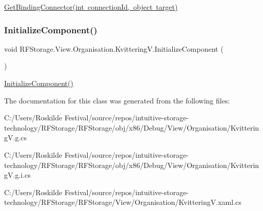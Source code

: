 \mbox{\hyperlink{class_r_f_storage_1_1_view_1_1_organisation_1_1_kvittering_v_a2eb92c4d9d4ef6ab0aed08083044615f}{Get\+Binding\+Connector(int connection\+Id, object target)}} 

\mbox{\label{class_r_f_storage_1_1_view_1_1_organisation_1_1_kvittering_v_af4cdfc1cc8430c3282e5c1dce8560fea}} 
\subsubsection{\texorpdfstring{InitializeComponent()}{InitializeComponent()}}
{\footnotesize\ttfamily void R\+F\+Storage.\+View.\+Organisation.\+Kvittering\+V.\+Initialize\+Component (\begin{DoxyParamCaption}{ }\end{DoxyParamCaption})}



\mbox{\hyperlink{class_r_f_storage_1_1_view_1_1_organisation_1_1_kvittering_v_af4cdfc1cc8430c3282e5c1dce8560fea}{Initialize\+Component()}} 



The documentation for this class was generated from the following files\+:\begin{DoxyCompactItemize}
\item 
C\+:/\+Users/\+Roskilde Festival/source/repos/intuitive-\/storage-\/technology/\+R\+F\+Storage/\+R\+F\+Storage/obj/x86/\+Debug/\+View/\+Organisation/Kvittering\+V.\+g.\+cs\item 
C\+:/\+Users/\+Roskilde Festival/source/repos/intuitive-\/storage-\/technology/\+R\+F\+Storage/\+R\+F\+Storage/obj/x86/\+Debug/\+View/\+Organisation/Kvittering\+V.\+g.\+i.\+cs\item 
C\+:/\+Users/\+Roskilde Festival/source/repos/intuitive-\/storage-\/technology/\+R\+F\+Storage/\+R\+F\+Storage/\+View/\+Organisation/Kvittering\+V.\+xaml.\+cs\end{DoxyCompactItemize}
